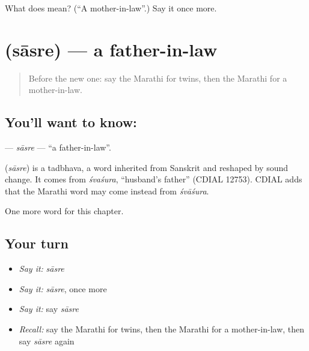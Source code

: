 \begin{tcolorbox}[breakable,colback=teal!4,colframe=teal!35!black,title={Before you move on}]
What does  mean? (\textquotedblleft{}A mother-in-law\textquotedblright{}.) Say it once more.
\end{tcolorbox}
\section[\texorpdfstring{\mr{सासरे} (sāsre)}{सासरे (sāsre)}]{ (sāsre) — a father-in-law}

\label{lesson:MR-C264-sasre}



\begin{quote}
Before the new one: say the Marathi for twins, then the Marathi for a mother-in-law.
\end{quote}

\subsection*{You'll want to know: }
\textbf{} — \emph{sāsre} — \textquotedblleft{}a father-in-law\textquotedblright{}.

\begin{cousinweb}
\textbf{} (\emph{sāsre}) is a tadbhava, a word inherited from Sanskrit and reshaped by sound change. It comes from \emph{śvaśura}, \textquotedblleft{}husband's father\textquotedblright{} (CDIAL 12753). CDIAL adds that the Marathi word may come instead from \emph{śvāśura}.
\end{cousinweb}

\begin{grammarlens}[title={What you've built}]
One more word for this chapter.
\end{grammarlens}

\subsection*{Your turn}
\begin{itemize}
\raggedright
  \item \emph{Say it:} \emph{sāsre}
  \item \emph{Say it:} \emph{sāsre}, once more
  \item \emph{Say it:} say \emph{sāsre}
  \item \emph{Recall:} say the Marathi for twins, then the Marathi for a mother-in-law, then say \emph{sāsre} again
\end{itemize}

